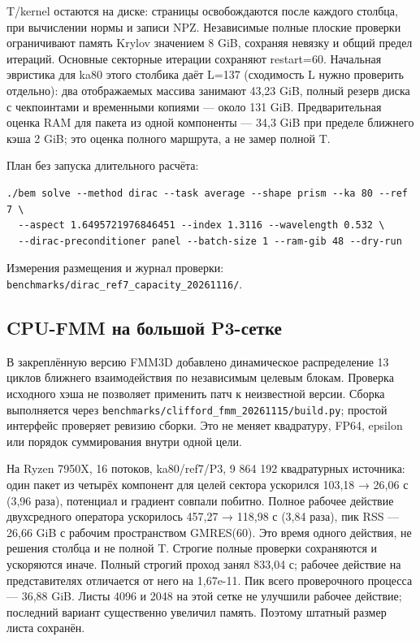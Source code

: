 \documentclass[
  russian,
  11pt,
  a4paper,
]{report}
\begin{document}
T/kernel остаются на диске: страницы освобождаются после каждого
столбца, при вычислении нормы и записи NPZ. Независимые полные плоские
проверки ограничивают память Krylov значением 8 GiB, сохраняя невязку и
общий предел итераций. Основные секторные итерации сохраняют restart=60.
Начальная эвристика для ka80 этого столбика даёт L=137 (сходимость L
нужно проверить отдельно): два отображаемых массива занимают 43,23 GiB,
полный резерв диска с чекпоинтами и временными копиями --- около 131
GiB. Предварительная оценка RAM для пакета из одной компоненты --- 34,3
GiB при пределе ближнего кэша 2 GiB; это оценка полного маршрута, а не
замер полной T.

План без запуска длительного расчёта:

\begin{verbatim}
./bem solve --method dirac --task average --shape prism --ka 80 --ref 7 \
  --aspect 1.6495721976846451 --index 1.3116 --wavelength 0.532 \
  --dirac-preconditioner panel --batch-size 1 --ram-gib 48 --dry-run
\end{verbatim}

Измерения размещения и журнал проверки:
\nolinkurl{benchmarks/dirac_ref7_capacity_20261116/}.

\subsection{CPU-FMM на большой
P3-сетке}\label{cpu-fmm-ux43dux430-ux431ux43eux43bux44cux448ux43eux439-p3-ux441ux435ux442ux43aux435}

В закреплённую версию FMM3D добавлено динамическое распределение 13
циклов ближнего взаимодействия по независимым целевым блокам. Проверка
исходного хэша не позволяет применить патч к неизвестной версии. Сборка
выполняется через \nolinkurl{benchmarks/clifford_fmm_20261115/build.py};
простой интерфейс проверяет ревизию сборки. Это не меняет квадратуру,
FP64, epsilon или порядок суммирования внутри одной цели.

На Ryzen 7950X, 16 потоков, ka80/ref7/P3, 9 864 192 квадратурных
источника: один пакет из четырёх компонент для целей сектора ускорился
103,18 → 26,06 с (3,96 раза), потенциал и градиент совпали побитно.
Полное рабочее действие двухсредного оператора ускорилось 457,27 →
118,98 с (3,84 раза), пик RSS --- 26,66 GiB с рабочим пространством
GMRES(60). Это время одного действия, не решения столбца и не полной T.
Строгие полные проверки сохраняются и ускоряются иначе. Полный строгий
проход занял 833,04 с; рабочее действие на представителях отличается от
него на 1,67e-11. Пик всего проверочного процесса --- 36,88 GiB. Листы
4096 и 2048 на этой сетке не улучшили рабочее действие; последний
вариант существенно увеличил память. Поэтому штатный размер листа
сохранён.
\end{document}
